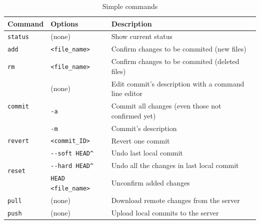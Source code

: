 \documentclass[a4paper,10pt]{article}
\begin{document}
\begin{table}[h]
\caption{Simple commands}
\centering
\begin{tabular}{l l l}
\hline\hline
Command & Options & Description \\
\hline\hline
\multirow{1}{*}{\texttt{status}} & (none) & Show current status \\ \hline
\multirow{1}{*}{\texttt{add}} & \texttt{<file\_name>} & Confirm changes to be commited (new files) \\ \hline
\multirow{1}{*}{\texttt{rm}} & \texttt{<file\_name>} & Confirm changes to be commited (deleted files) \\ \hline
\multirow{3}{*}{\texttt{commit}} & (none) & Edit commit's description with a command line editor \\
& \texttt{-a} & Commit all changes (even those not confirmed yet) \\
& \texttt{-m} & Commit's description \\ \hline
\multirow{1}{*}{\texttt{revert}} & \texttt{<commit\_ID>} & Revert one commit \\ \hline
\multirow{3}{*}{\texttt{reset}} & \texttt{-{}-soft HEAD\^} & Undo last local commit  \\
& \texttt{-{}-hard HEAD\^} & Undo all the changes in last local commit \\
& \texttt{HEAD <file\_name>} & Unconfirm added changes \\ \hline
\multirow{1}{*}{\texttt{pull}} & (none) & Download remote changes from the server  \\ \hline
\multirow{1}{*}{\texttt{push}} & (none) & Upload local commits to the server  \\ \hline
\hline
\end{tabular}
\end{table}
\end{document}
